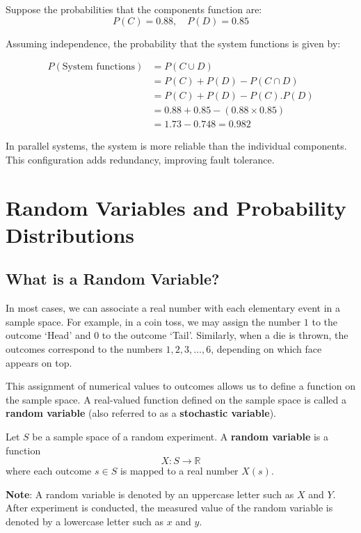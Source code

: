 \documentclass[twoside]{book}
\begin{document}
\begin{enumerate}
\begin{center}
\end{center}

Suppose the probabilities that the components function are:
\[
P(C) = 0.88, \quad P(D) = 0.85
\]

Assuming independence, the probability that the system functions is given by:

\[
\begin{aligned}
P(\text{System functions}) &= P(C \cup D) \\
&= P(C) + P(D) - P(C \cap D) \\
&= P(C) + P(D) - P(C).P(D) \\
&= 0.88 + 0.85 - (0.88 \times 0.85) \\
&= 1.73 - 0.748 = 0.982
\end{aligned}
\]

In parallel systems, the system is more reliable than the individual components. This configuration adds redundancy, improving fault tolerance.
\end{enumerate}

\chapter{Random Variables and Probability Distributions}
\section{What is a Random Variable?}
In most cases, we can associate a real number with each elementary event in a sample space. For example, in a coin toss, we may assign the number \(1\) to the outcome `Head' and \(0\) to the outcome `Tail'. Similarly, when a die is thrown, the outcomes correspond to the numbers \(1, 2, 3, \dots, 6\), depending on which face appears on top.

This assignment of numerical values to outcomes allows us to define a function on the sample space. A real-valued function defined on the sample space is called a \textbf{random variable} (also referred to as a \textbf{stochastic variable}).

\begin{textbox}
    Let \( S \) be a sample space of a random experiment. A \textbf{random variable} is a function
\[
X : S \rightarrow \mathbb{R}
\]
where each outcome \( s \in S \) is mapped to a real number \( X(s) \).

\end{textbox}
\textbf{Note}: A random variable is denoted by an uppercase letter such as $X$ and $Y$. After experiment is conducted, the measured value of the random variable is denoted by a lowercase letter such as $x$
and $y$.
\end{document}
